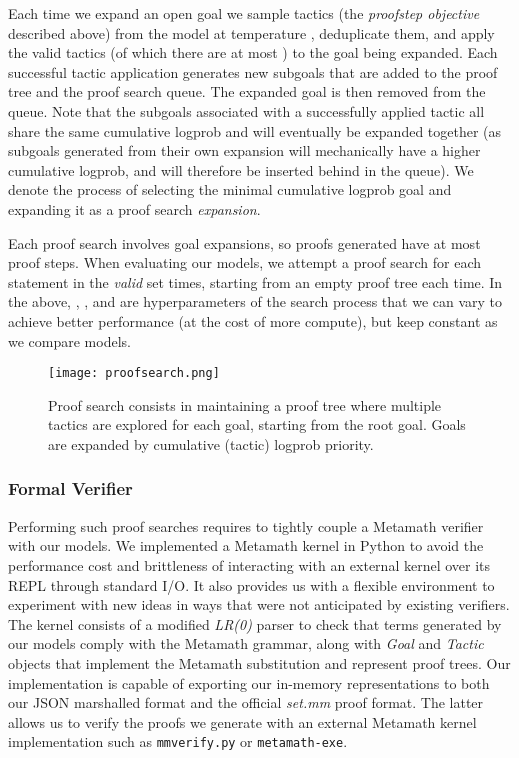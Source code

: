 \documentclass{article}
\begin{document}
Each time we expand an open goal we sample  tactics (the \textit{proofstep objective} described above) from the model at temperature , deduplicate them, and apply the valid tactics (of which there are at most ) to the goal being expanded. Each successful tactic application generates new subgoals that are added to the proof tree and the proof search queue. The expanded goal is then removed from the queue. Note that the subgoals associated with a successfully applied tactic all share the same cumulative logprob and will eventually be expanded together (as subgoals generated from their own expansion will mechanically have a higher cumulative logprob, and will therefore be inserted behind in the queue). We denote the process of selecting the minimal cumulative logprob goal and expanding it as a proof search \textit{expansion}. 

Each proof search involves  goal expansions, so proofs generated have at most  proof steps. When evaluating our models, we attempt a proof search for each statement in the \textit{valid} set  times, starting from an empty proof tree each time. In the above, , , and  are hyperparameters of the search process that we can vary to achieve better performance (at the cost of more compute), but keep constant as we compare models.

\begin{figure}
    \texttt{[image: proofsearch.png]}
    \caption{Proof search consists in maintaining a proof tree where multiple tactics are explored for each goal, starting from the root goal. Goals are expanded by cumulative (tactic) logprob priority.}
    \label{fig:proofsearch}
\end{figure}

\subsubsection{Formal Verifier}
Performing such proof searches requires to tightly couple a Metamath verifier with our models. We implemented a Metamath kernel in Python to avoid the performance cost and brittleness of interacting with an external kernel over its REPL through standard I/O. It also provides us with a flexible environment to experiment with new ideas in ways that were not anticipated by existing verifiers. The kernel consists of a modified \textit{LR(0)} parser to check that terms generated by our models comply with the Metamath grammar, along with \textit{Goal} and \textit{Tactic} objects that implement the Metamath substitution and represent proof trees. Our implementation is capable of exporting our in-memory representations to both our JSON marshalled format and the official \textit{set.mm} proof format. The latter allows us to verify the proofs we generate with an external Metamath kernel implementation such as \verb|mmverify.py| or \verb|metamath-exe|.
\end{document}
